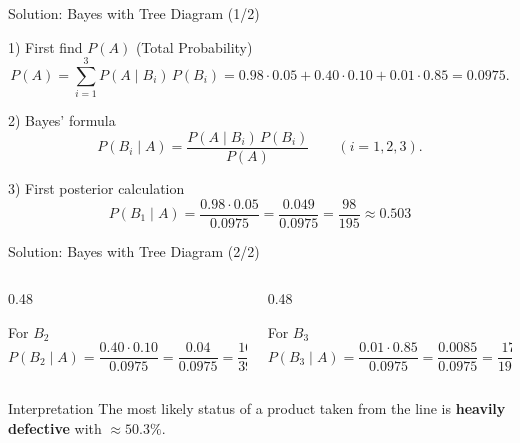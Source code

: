 \documentclass[light]{lutbeamer}
\begin{document}

\begin{frame}{Solution: Bayes with Tree Diagram (1/2)}
\small

\begin{block}{1) First find $P(A)$ (Total Probability)}
\begin{equation}
\label{eq:PA_tree}
P(A)=\sum_{i=1}^3 P(A\mid B_i)\,P(B_i)
=0.98\cdot 0.05 + 0.40\cdot 0.10 + 0.01\cdot 0.85
=0.0975.
\end{equation}
\end{block}

\begin{alertblock}{2) Bayes' formula}
\begin{equation}
\label{eq:posterior_tree}
P(B_i\mid A)=\frac{P(A\mid B_i)\,P(B_i)}{P(A)} \qquad (i=1,2,3).
\end{equation}
\end{alertblock}

\begin{block}{3) First posterior calculation}
\[
P(B_1\mid A)=\frac{0.98\cdot 0.05}{0.0975}
=\frac{0.049}{0.0975}
=\frac{98}{195}\approx 0.503
\]
\end{block}

\end{frame}

\begin{frame}{Solution: Bayes with Tree Diagram (2/2)}
\small

\begin{columns}[T]
\begin{column}{0.48\textwidth}
\begin{block}{For $B_2$}
\[
P(B_2\mid A)=\frac{0.40\cdot 0.10}{0.0975}
=\frac{0.04}{0.0975}
=\frac{16}{39}\approx 0.410
\]
\end{block}
\end{column}

\begin{column}{0.48\textwidth}
\begin{block}{For $B_3$}
\[
P(B_3\mid A)=\frac{0.01\cdot 0.85}{0.0975}
=\frac{0.0085}{0.0975}
=\frac{17}{195}\approx 0.087
\]
\end{block}
\end{column}
\end{columns}

\begin{alertblock}{Interpretation}
The most likely status of a product taken from the line is \textbf{heavily defective} with \(\approx 50.3\%\).
\end{alertblock}

\end{frame}
\end{document}
